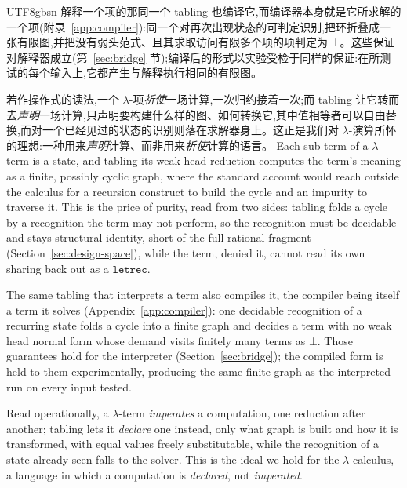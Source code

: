 \begin{CJK*}{UTF8}{gbsn}
  解释一个项的那同一个 tabling 也编译它,而编译器本身就是它所求解的一个项(附录~\ref{app:compiler}):同一个对再次出现状态的可判定识别,把环折叠成一张有限图,并把没有弱头范式、且其求取访问有限多个项的项判定为 $\bot$。这些保证对解释器成立(第~\ref{sec:bridge} 节);编译后的形式以实验受检于同样的保证:在所测试的每个输入上,它都产生与解释执行相同的有限图。

  若作操作式的读法,一个 $\lambda$-项\emph{祈使}一场计算,一次归约接着一次;而 tabling 让它转而去\emph{声明}一场计算,只声明要构建什么样的图、如何转换它,其中值相等者可以自由替换,而对一个已经见过的状态的识别则落在求解器身上。这正是我们对 $\lambda$-演算所怀的理想:一种用来\emph{声明}计算、而非用来\emph{祈使}计算的语言。
  \else
  Each sub-term of a $\lambda$-term is a state, and tabling its weak-head reduction computes the term's meaning as a finite, possibly cyclic graph, where the standard account would reach outside the calculus for a recursion construct to build the cycle and an impurity to traverse it. This is the price of purity, read from two sides: tabling folds a cycle by a recognition the term may not perform, so the recognition must be decidable and stays structural identity, short of the full rational fragment (Section~\ref{sec:design-space}), while the term, denied it, cannot read its own sharing back out as a $\mathtt{letrec}$.

  The same tabling that interprets a term also compiles it, the compiler being itself a term it solves (Appendix~\ref{app:compiler}): one decidable recognition of a recurring state folds a cycle into a finite graph and decides a term with no weak head normal form whose demand visits finitely many terms as $\bot$. Those guarantees hold for the interpreter (Section~\ref{sec:bridge}); the compiled form is held to them experimentally, producing the same finite graph as the interpreted run on every input tested.

  Read operationally, a $\lambda$-term \emph{imperates} a computation, one reduction after another; tabling lets it \emph{declare} one instead, only what graph is built and how it is transformed, with equal values freely substitutable, while the recognition of a state already seen falls to the solver. This is the ideal we hold for the $\lambda$-calculus, a language in which a computation is \emph{declared}, not \emph{imperated}.
  \fi

  \fi %

  \ifTablambdaBody
  \ifTablambdaLNCS\else\fi
  
  \fi


\end{CJK*}

